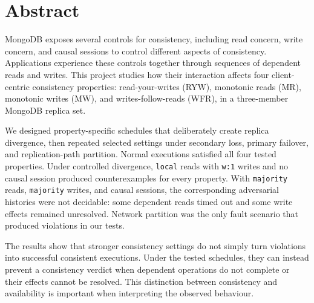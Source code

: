\section*{Abstract}

MongoDB exposes several controls for consistency, including read concern,
write concern, and causal sessions to control different aspects of consistency. Applications experience these controls together through sequences of dependent reads and writes. This project studies how their interaction
affects four client-centric consistency properties: read-your-writes (RYW),
monotonic reads (MR), monotonic writes (MW), and writes-follow-reads (WFR), in
a three-member MongoDB replica set.

We designed property-specific schedules that deliberately create replica
divergence, then repeated selected settings under secondary loss, primary
failover, and replication-path partition. Normal executions satisfied all four
tested properties. Under controlled divergence, \texttt{local} reads with
\texttt{w:1} writes and no causal session produced counterexamples for every
property. With \texttt{majority} reads, \texttt{majority} writes, and causal
sessions, the corresponding adversarial histories were not decidable: some
dependent reads timed out and some write effects remained unresolved. Network
partition was the only fault scenario that produced violations in our tests.

The results show that stronger consistency settings do not simply turn
violations into successful consistent executions. Under the tested schedules,
they can instead prevent a consistency verdict when dependent operations do
not complete or their effects cannot be resolved. This distinction between
consistency and availability is important when interpreting the observed
behaviour.
